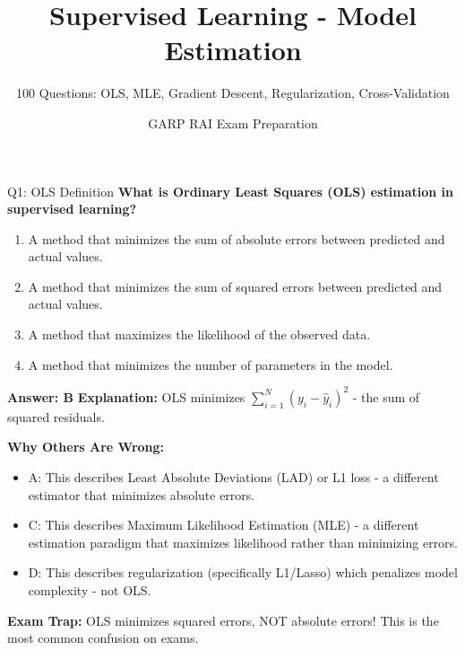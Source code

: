 \documentclass[8pt]{beamer}
\title{Supervised Learning - Model Estimation}
\subtitle{100 Questions: OLS, MLE, Gradient Descent, Regularization, Cross-Validation}
\author{GARP RAI Exam Preparation}
\date{}
\begin{document}
	
	\begin{frame}
		\titlepage
	\end{frame}
	
	
	\begin{frame}{Q1: OLS Definition}
		\fontsize{6.5}{7.5}\selectfont
		\textbf{What is Ordinary Least Squares (OLS) estimation in supervised learning?}
		
		\begin{enumerate}
			\item A method that minimizes the sum of absolute errors between predicted and actual values.
			\item A method that minimizes the sum of squared errors between predicted and actual values.
			\item A method that maximizes the likelihood of the observed data.
			\item A method that minimizes the number of parameters in the model.
		\end{enumerate}
		
		\vspace{0.05cm}
		\textcolor{myblue}{\textbf{Answer: B}}
		\vspace{0.05cm}
		\textcolor{myblue}{\textbf{Explanation:}} OLS minimizes $\sum_{i=1}^N (y_i - \hat{y}_i)^2$ - the sum of squared residuals.
		
		\vspace{0.05cm}
		\textcolor{myred}{\textbf{Why Others Are Wrong:}}
		\begin{itemize}
			\item \textcolor{myred}{A:} This describes Least Absolute Deviations (LAD) or L1 loss - a different estimator that minimizes absolute errors.
			\item \textcolor{myred}{C:} This describes Maximum Likelihood Estimation (MLE) - a different estimation paradigm that maximizes likelihood rather than minimizing errors.
			\item \textcolor{myred}{D:} This describes regularization (specifically L1/Lasso) which penalizes model complexity - not OLS.
		\end{itemize}
		
		\textcolor{myred}{\textbf{Exam Trap:}} OLS minimizes \textcolor{myblue}{squared errors}, NOT absolute errors! This is the most common confusion on exams.
	\end{frame}
	
\end{document}
